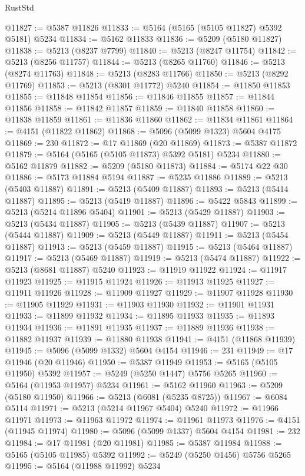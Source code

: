 \begin{lexlean}{RustStd}
\begin{coremodule}
@11827 := @5387 @11826
@11833 := @5164 (@5165 (@5105 @11827) @5392 @5181) @5234
@11834 := @5162 @11833
@11836 := @5209 (@5180 @11827)
@11838 := @5213 (@8237 @7799)
@11840 := @5213 (@8247 @11754)
@11842 := @5213 (@8256 @11757)
@11844 := @5213 (@8265 @11760)
@11846 := @5213 (@8274 @11763)
@11848 := @5213 (@8283 @11766)
@11850 := @5213 (@8292 @11769)
@11853 := @5213 (@8301 @11772) @5240
@11854 := @11850 @11853
@11855 := @11848 @11854
@11856 := @11846 @11855
@11857 := @11844 @11856
@11858 := @11842 @11857
@11859 := @11840 @11858
@11860 := @11838 @11859
@11861 := @11836 @11860
@11862 := @11834 @11861
@11864 := @4151 (@11822 @11862)
@11868 := @5096 (@5099 @1323) @5604 @4175
@11869 := 230
@11872 := @17 @11869 (@20 @11869)
@11873 := @5387 @11872
@11879 := @5164 (@5165 (@5105 @11873) @5392 @5181) @5234
@11880 := @5162 @11879
@11882 := @5209 (@5180 @11873)
@11884 := @5174 @22 @30
@11886 := @5173 @11884 @5194
@11887 := @5235 @11886
@11889 := @5213 (@5403 @11887)
@11891 := @5213 (@5409 @11887)
@11893 := @5213 (@5414 @11887)
@11895 := @5213 (@5419 @11887)
@11896 := @5422 @5843
@11899 := @5213 (@5214 @11896 @5404)
@11901 := @5213 (@5429 @11887)
@11903 := @5213 (@5434 @11887)
@11905 := @5213 (@5439 @11887)
@11907 := @5213 (@5444 @11887)
@11909 := @5213 (@5449 @11887)
@11911 := @5213 (@5454 @11887)
@11913 := @5213 (@5459 @11887)
@11915 := @5213 (@5464 @11887)
@11917 := @5213 (@5469 @11887)
@11919 := @5213 (@5474 @11887)
@11922 := @5213 (@8681 @11887) @5240
@11923 := @11919 @11922
@11924 := @11917 @11923
@11925 := @11915 @11924
@11926 := @11913 @11925
@11927 := @11911 @11926
@11928 := @11909 @11927
@11929 := @11907 @11928
@11930 := @11905 @11929
@11931 := @11903 @11930
@11932 := @11901 @11931
@11933 := @11899 @11932
@11934 := @11895 @11933
@11935 := @11893 @11934
@11936 := @11891 @11935
@11937 := @11889 @11936
@11938 := @11882 @11937
@11939 := @11880 @11938
@11941 := @4151 (@11868 @11939)
@11945 := @5096 (@5099 @1332) @5604 @4154
@11946 := 231
@11949 := @17 @11946 (@20 @11946)
@11950 := @5387 @11949
@11953 := @5165 (@5105 @11950) @5392
@11957 := @5249 (@5250 @1447) @5756 @5265
@11960 := @5164 (@11953 @11957) @5234
@11961 := @5162 @11960
@11963 := @5209 (@5180 @11950)
@11966 := @5213 (@6081 (@5235 @8725))
@11967 := @6084 @5114
@11971 := @5213 (@5214 @11967 @5404) @5240
@11972 := @11966 @11971
@11973 := @11963 @11972
@11974 := @11961 @11973
@11976 := @4151 (@11945 @11974)
@11980 := @5096 (@5099 @1337) @5604 @4154
@11981 := 232
@11984 := @17 @11981 (@20 @11981)
@11985 := @5387 @11984
@11988 := @5165 (@5105 @11985) @5392
@11992 := @5249 (@5250 @1456) @5756 @5265
@11995 := @5164 (@11988 @11992) @5234

\end{coremodule}
\end{lexlean}
